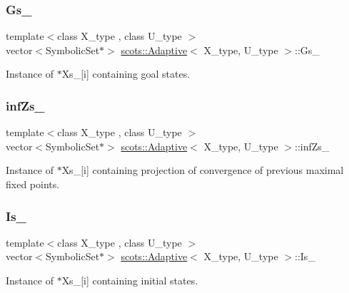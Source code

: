 \subsubsection{\texorpdfstring{Gs\+\_\+}{Gs\_}}
{\footnotesize\ttfamily template$<$class X\+\_\+type , class U\+\_\+type $>$ \\
vector$<$Symbolic\+Set$\ast$$>$ \hyperlink{classscots_1_1Adaptive}{scots\+::\+Adaptive}$<$ X\+\_\+type, U\+\_\+type $>$\+::Gs\+\_\+}

Instance of $\ast$\+Xs\+\_\+\mbox{[}i\mbox{]} containing goal states. \mbox{\label{classscots_1_1Adaptive_ad197683891b126e16f0f377d778fd352}} 
\subsubsection{\texorpdfstring{inf\+Zs\+\_\+}{infZs\_}}
{\footnotesize\ttfamily template$<$class X\+\_\+type , class U\+\_\+type $>$ \\
vector$<$Symbolic\+Set$\ast$$>$ \hyperlink{classscots_1_1Adaptive}{scots\+::\+Adaptive}$<$ X\+\_\+type, U\+\_\+type $>$\+::inf\+Zs\+\_\+}

Instance of $\ast$\+Xs\+\_\+\mbox{[}i\mbox{]} containing projection of convergence of previous maximal fixed points. \mbox{\label{classscots_1_1Adaptive_a1421430af54b816e57d7cc4db6f1a83d}} 
\subsubsection{\texorpdfstring{Is\+\_\+}{Is\_}}
{\footnotesize\ttfamily template$<$class X\+\_\+type , class U\+\_\+type $>$ \\
vector$<$Symbolic\+Set$\ast$$>$ \hyperlink{classscots_1_1Adaptive}{scots\+::\+Adaptive}$<$ X\+\_\+type, U\+\_\+type $>$\+::Is\+\_\+}

Instance of $\ast$\+Xs\+\_\+\mbox{[}i\mbox{]} containing initial states. \mbox{\label{classscots_1_1Adaptive_aebaf5b4abaa33f4494491cbe67b42b80}} 
